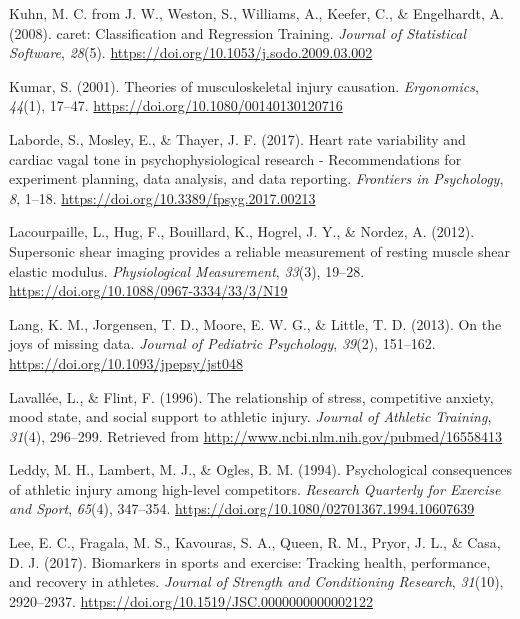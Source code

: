 \documentclass[
  english,
  man,floatsintext]{apa6}
\begin{document}
\leavevmode\hypertarget{ref-Kuhn2008}{}%
Kuhn, M. C. from J. W., Weston, S., Williams, A., Keefer, C., \& Engelhardt, A. (2008). caret: Classification and Regression Training. \emph{Journal of Statistical Software}, \emph{28}(5). \url{https://doi.org/10.1053/j.sodo.2009.03.002}

\leavevmode\hypertarget{ref-Kumar2001}{}%
Kumar, S. (2001). Theories of musculoskeletal injury causation. \emph{Ergonomics}, \emph{44}(1), 17--47. \url{https://doi.org/10.1080/00140130120716}

\leavevmode\hypertarget{ref-Laborde2017}{}%
Laborde, S., Mosley, E., \& Thayer, J. F. (2017). Heart rate variability and cardiac vagal tone in psychophysiological research - Recommendations for experiment planning, data analysis, and data reporting. \emph{Frontiers in Psychology}, \emph{8}, 1--18. \url{https://doi.org/10.3389/fpsyg.2017.00213}

\leavevmode\hypertarget{ref-Lacourpaille2012}{}%
Lacourpaille, L., Hug, F., Bouillard, K., Hogrel, J. Y., \& Nordez, A. (2012). Supersonic shear imaging provides a reliable measurement of resting muscle shear elastic modulus. \emph{Physiological Measurement}, \emph{33}(3), 19--28. \url{https://doi.org/10.1088/0967-3334/33/3/N19}

\leavevmode\hypertarget{ref-Lang2014}{}%
Lang, K. M., Jorgensen, T. D., Moore, E. W. G., \& Little, T. D. (2013). On the joys of missing data. \emph{Journal of Pediatric Psychology}, \emph{39}(2), 151--162. \url{https://doi.org/10.1093/jpepsy/jst048}

\leavevmode\hypertarget{ref-Lavallee1996}{}%
Lavallée, L., \& Flint, F. (1996). The relationship of stress, competitive anxiety, mood state, and social support to athletic injury. \emph{Journal of Athletic Training}, \emph{31}(4), 296--299. Retrieved from \url{http://www.ncbi.nlm.nih.gov/pubmed/16558413}

\leavevmode\hypertarget{ref-Leddy1994}{}%
Leddy, M. H., Lambert, M. J., \& Ogles, B. M. (1994). Psychological consequences of athletic injury among high-level competitors. \emph{Research Quarterly for Exercise and Sport}, \emph{65}(4), 347--354. \url{https://doi.org/10.1080/02701367.1994.10607639}

\leavevmode\hypertarget{ref-Lee2017}{}%
Lee, E. C., Fragala, M. S., Kavouras, S. A., Queen, R. M., Pryor, J. L., \& Casa, D. J. (2017). Biomarkers in sports and exercise: Tracking health, performance, and recovery in athletes. \emph{Journal of Strength and Conditioning Research}, \emph{31}(10), 2920--2937. \url{https://doi.org/10.1519/JSC.0000000000002122}
\end{document}
